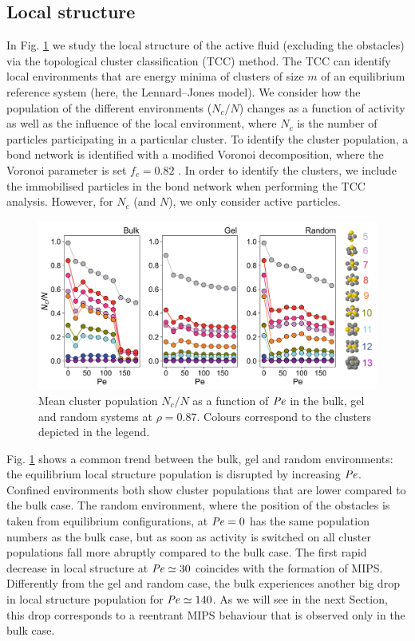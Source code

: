 \subsection{Local structure}
\label{section:Local structure}
In Fig. \ref{fig:figTCC} we study the local structure of the active fluid (excluding the obstacles) via the topological cluster classification (TCC) method. The TCC can identify local environments that are energy minima of clusters of size $m$ of an equilibrium reference system (here, the Lennard--Jones model). We consider how the population of the different environments ($N_c / N$) changes as a function of activity as well as the influence of the local environment, where $N_c$ is the number of particles participating in a particular cluster. To identify the cluster population, a bond network is identified with a modified Voronoi decomposition, where the Voronoi parameter is set $f_c=0.82$ \cite{malins2013}. In order to identify the clusters, we include the immobilised particles in the bond network when performing the TCC analysis. However, for $N_c$ (and $N$), we only consider active particles.

\begin{figure}
	\centering
	\includegraphics[width=\linewidth]{chapters/activeConfinement/figsActiveConfinement/figTCC_labelled.png}
	\caption[Local structure in the three systems]{Mean cluster population $N_c / N$ as a function of $\operatorname{\mathit{P\kern-.08em e}}$ in the  bulk, gel and random systems at $\rho=0.87$. Colours correspond to the clusters depicted in the legend.}
	\label{fig:figTCC}
\end{figure}


Fig. \ref{fig:figTCC} shows a common trend between the bulk, gel and random environments: the equilibrium local structure population is disrupted by increasing $\operatorname{\mathit{P\kern-.08em e}}$. Confined environments both show cluster populations that are lower compared to the bulk case. The random environment, where the position of the obstacles is taken from equilibrium configurations, at $\operatorname{\mathit{P\kern-.08em e}}=0$ has the same population numbers as the bulk case, but as soon as activity is switched on all cluster populations fall more abruptly compared to the bulk case. The first rapid decrease in local structure at $\operatorname{\mathit{P\kern-.08em e}}\simeq 30$ coincides with the formation of MIPS. Differently from the gel and random case, the bulk experiences another big drop in local structure population for $\operatorname{\mathit{P\kern-.08em e}}\simeq 140$. As we will see in the next Section, this drop corresponds to a reentrant MIPS behaviour that is observed only in the bulk case.

